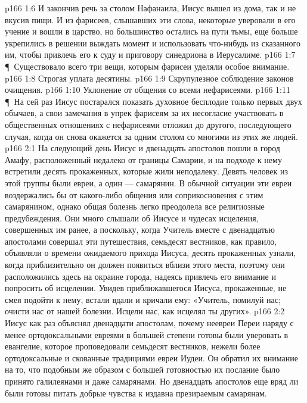 \vs p166 1:6 И закончив речь за столом Нафанаила, Иисус вышел из дома, так и не вкусив пищи. И из фарисеев, слышавших эти слова, некоторые уверовали в его учение и вошли в царство, но большинство остались на пути тьмы, еще больше укрепились в решении выждать момент и использовать что\hyp{}нибудь из сказанного им, чтобы привлечь его к суду и приговору синедриона в Иерусалиме.
\vs p166 1:7 \P\ Существовало всего три вещи, которым фарисеи уделяли особое внимание.
\vs p166 1:8 \bibnobreakspace Строгая уплата десятины.
\vs p166 1:9 \bibnobreakspace Скрупулезное соблюдение законов очищения.
\vs p166 1:10 \bibnobreakspace Уклонение от общения со всеми нефарисеями.
\vs p166 1:11 \P\ На сей раз Иисус постарался показать духовное бесплодие только первых двух обычаев, а свои замечания в упрек фарисеям за их несогласие участвовать в общественных отношениях с нефарисеями отложил до другого, последующего случая, когда он снова окажется за одним столом со многими из этих же людей.
\vs p166 2:1 На следующий день Иисус и двенадцать апостолов пошли в город Амафу, расположенный недалеко от границы Самарии, и на подходе к нему встретили десять прокаженных, которые жили неподалеку. Девять человек из этой группы были евреи, а один --- самарянин. В обычной ситуации эти евреи воздержались бы от какого\hyp{}либо общения или соприкосновения с этим самарянином, однако общая болезнь легко преодолела все религиозные предубеждения. Они много слышали об Иисусе и чудесах исцеления, совершенных им ранее, а поскольку, когда Учитель вместе с двенадцатью апостолами совершал эти путешествия, семьдесят вестников, как правило, объявляли о времени ожидаемого прихода Иисуса, десять прокаженных узнали, когда приблизительно он должен появиться вблизи этого места, поэтому они расположились здесь на окраине города, надеясь привлечь его внимание и попросить об исцелении. Увидев приближавшегося Иисуса, прокаженные, не смея подойти к нему, встали вдали и кричали ему: «Учитель, помилуй нас; очисти нас от нашей болезни. Исцели нас, как исцелял ты других».
\vs p166 2:2 Иисус как раз объяснял двенадцати апостолам, почему неевреи Переи наряду с менее ортодоксальными евреями в большей степени готовы были уверовать в евангелие, которое проповедовали семьдесят вестников, нежели более ортодоксальные и скованные традициями евреи Иудеи. Он обратил их внимание на то, что подобным же образом с большей готовностью их послание было принято галилеянами и даже самарянами. Но двенадцать апостолов еще вряд ли были готовы питать добрые чувства к издавна презираемым самарянам.

